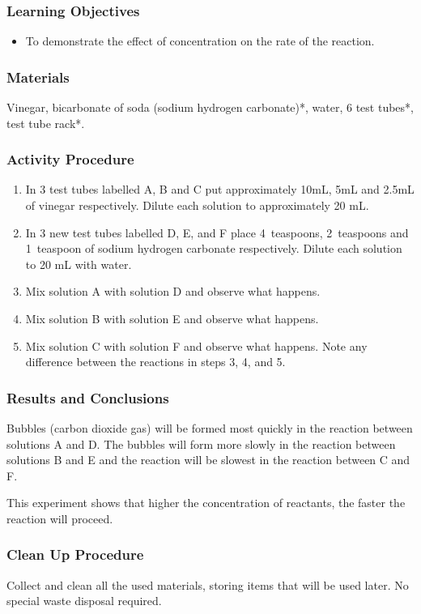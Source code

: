 \subsubsection*{Learning Objectives}
\begin{itemize}
\item{To demonstrate the effect of concentration on the rate of the reaction.}
\end{itemize}

\subsubsection*{Materials}
Vinegar, bicarbonate of soda (sodium hydrogen carbonate)*, water, 6 test tubes*, test tube rack*.

\subsubsection*{Activity Procedure}
\begin{enumerate}
\item{In 3 test tubes labelled A, B and C put approximately 10mL, 5mL and 2.5mL of vinegar respectively. Dilute each solution to approximately 20 mL.}
\item{In 3 new test tubes labelled D, E, and F place 4~teaspoons, 2~teaspoons and 1~teaspoon of sodium hydrogen carbonate respectively. Dilute each solution to 20 mL with water.}
\item{Mix solution A with solution D and observe what happens.}
\item{Mix solution B with solution E and observe what happens.}
\item{Mix solution C with solution F and observe what happens. Note any difference between the reactions in steps 3, 4, and 5.}
\end{enumerate}

\subsubsection*{Results and Conclusions}
Bubbles (carbon dioxide gas) will be formed most quickly in the reaction between solutions A and D. The bubbles will form more slowly in the reaction between solutions B and E and the reaction will be slowest in the reaction between C and F. 

This experiment shows that higher the concentration of reactants, the faster the reaction will proceed.

\subsubsection*{Clean Up Procedure}
Collect and clean all the used materials, storing items that will be used later. No special waste disposal required.

